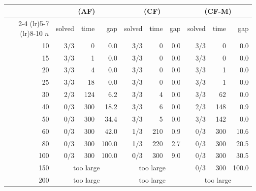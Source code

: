 \begin{tabular}{rrrrrrrrrr}
\toprule
 & \multicolumn{3}{c}{(AF)} & \multicolumn{3}{c}{(CF)} & \multicolumn{3}{c}{(CF-M)} \\
\cmidrule(lr){2-4} \cmidrule(lr){5-7} \cmidrule(lr){8-10}
$n$ & solved & time & gap & solved & time & gap & solved & time & gap \\
\midrule
10 & 3/3 & 0 & 0.0 & 3/3 & 0 & 0.0 & 3/3 & 0 & 0.0 \\
15 & 3/3 & 1 & 0.0 & 3/3 & 0 & 0.0 & 3/3 & 0 & 0.0 \\
20 & 3/3 & 4 & 0.0 & 3/3 & 0 & 0.0 & 3/3 & 1 & 0.0 \\
25 & 3/3 & 18 & 0.0 & 3/3 & 0 & 0.0 & 3/3 & 1 & 0.0 \\
30 & 2/3 & 124 & 6.2 & 3/3 & 4 & 0.0 & 3/3 & 62 & 0.0 \\
40 & 0/3 & 300 & 18.2 & 3/3 & 6 & 0.0 & 2/3 & 148 & 0.9 \\
50 & 0/3 & 300 & 34.4 & 3/3 & 5 & 0.0 & 3/3 & 142 & 0.0 \\
60 & 0/3 & 300 & 42.0 & 1/3 & 210 & 0.9 & 0/3 & 300 & 10.6 \\
80 & 0/3 & 300 & 100.0 & 1/3 & 220 & 2.7 & 0/3 & 300 & 20.5 \\
100 & 0/3 & 300 & 100.0 & 0/3 & 300 & 9.0 & 0/3 & 300 & 30.5 \\
150 & \multicolumn{3}{c}{too large} & \multicolumn{3}{c}{too large} & 0/3 & 300 & 100.0 \\
200 & \multicolumn{3}{c}{too large} & \multicolumn{3}{c}{too large} & \multicolumn{3}{c}{too large} \\
\bottomrule
\end{tabular}
